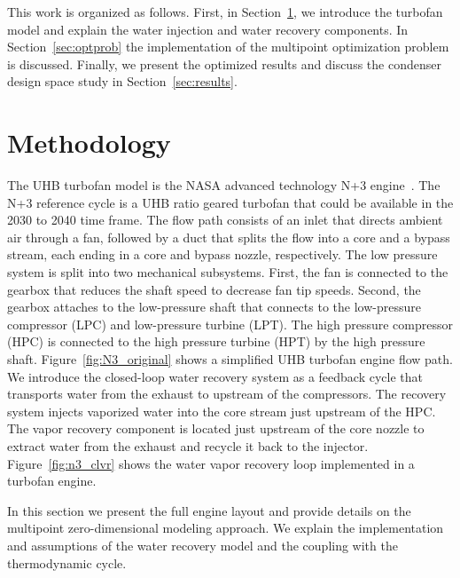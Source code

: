 \documentclass[conf]{new-aiaa}
\begin{document}
This work is organized as follows. First, in Section~\ref{sec:method}, we introduce the turbofan model and explain the water injection and water recovery components.
In Section~\ref{sec:optprob} the implementation of the multipoint optimization problem is discussed.
Finally, we present the optimized results and discuss the condenser design space study in Section~\ref{sec:results}.

\section{Methodology}
\label{sec:method}
The UHB turbofan model is the NASA advanced technology N+3 engine~\cite{Jones2017a}.
The N+3 reference cycle is a UHB ratio geared turbofan that could be available in the 2030 to 2040 time frame.
The flow path consists of an inlet that directs ambient air through a fan, followed by a duct that splits the flow into a core and a bypass stream, each ending in a core and bypass nozzle, respectively.
The low pressure system is split into two mechanical subsystems.
First, the fan is connected to the gearbox that reduces the shaft speed to decrease fan tip speeds.
Second, the gearbox attaches to the low-pressure shaft that connects to the low-pressure compressor (LPC) and low-pressure turbine (LPT).
The high pressure compressor (HPC) is connected to the high pressure turbine (HPT) by the high pressure shaft.
Figure~\ref{fig:N3_original} shows a simplified UHB turbofan engine flow path.
We introduce the closed-loop water recovery system as a feedback cycle that transports water from the exhaust to upstream of the compressors.
The recovery system injects vaporized water into the core stream just upstream of the HPC.
The vapor recovery component is located just upstream of the core nozzle to extract water from the exhaust and recycle it back to the injector.
Figure~\ref{fig:n3_clvr} shows the water vapor recovery loop implemented in a turbofan engine.

In this section we present the full engine layout and provide details on the multipoint zero-dimensional modeling approach.
We explain the implementation and assumptions of the water recovery model and the coupling with the thermodynamic cycle.
\end{document}
